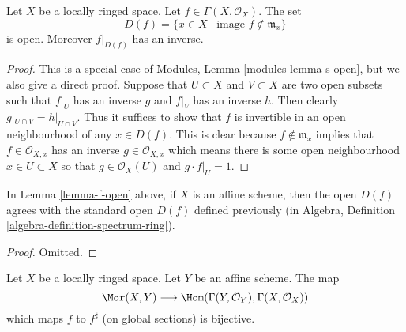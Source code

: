 \begin{lemma}
\label{lemma-f-open}
Let $X$ be a locally ringed space.
Let $f \in \Gamma(X, \mathcal{O}_X)$.
The set
$$
D(f) = \{x \in X \mid \text{image }f \not\in \mathfrak m_x\}
$$
is open. Moreover $f|_{D(f)}$ has an inverse.
\end{lemma}

\begin{proof}
This is a special case of Modules, Lemma \ref{modules-lemma-s-open}, but
we also give a direct proof.
Suppose that $U \subset X$ and $V \subset X$ are
two open subsets such that $f|_U$ has an inverse
$g$ and $f|_V$ has an inverse $h$. Then clearly
$g|_{U\cap V} = h|_{U\cap V}$. Thus it suffices
to show that $f$ is invertible in an open neighbourhood
of any $x \in D(f)$. This is clear because
$f \not \in \mathfrak m_x$ implies that $f \in \mathcal{O}_{X, x}$
has an inverse $g \in \mathcal{O}_{X, x}$ which means there
is some open neighbourhood $x \in U \subset X$ so
that $g \in \mathcal{O}_X(U)$ and $g\cdot f|_U = 1$.
\end{proof}

\begin{lemma}
\label{lemma-f-open-affine}
In Lemma \ref{lemma-f-open} above, if $X$ is an affine scheme,
then the open $D(f)$ agrees with the standard open $D(f)$
defined previously (in
Algebra, Definition \ref{algebra-definition-spectrum-ring}).
\end{lemma}

\begin{proof}
Omitted.
\end{proof}

\begin{lemma}
\label{lemma-morphism-into-affine}
Let $X$ be a locally ringed space.
Let $Y$ be an affine scheme.
The map
$$
\Mor(X, Y)
\longrightarrow
\Hom(\Gamma(Y, \mathcal{O}_Y), \Gamma(X, \mathcal{O}_X))
$$
which maps $f$ to $f^\sharp$ (on global sections) is bijective.
\end{lemma}

